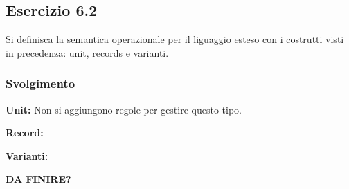 \subsection*{Esercizio 6.2}
Si definisca la semantica operazionale per il liguaggio esteso con i costrutti visti in precedenza: unit, records e varianti.

\subsubsection*{Svolgimento}

\textbf{Unit:} 
Non si aggiungono regole per gestire questo tipo.

\textbf{Record:} 

\begin{prooftree}    
\end{prooftree} 

\textbf{Varianti:} 

\begin{prooftree}    
\end{prooftree}

\begin{prooftree}    
\end{prooftree} 

\textbf{{\color{red} DA FINIRE?}}

